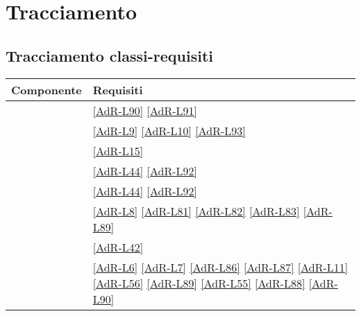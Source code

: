 \section{Tracciamento}
\subsection{Tracciamento classi-requisiti}
\begin{longtable}{|m{12cm}|>{\centering}m{2cm}|}
	\hline \textbf{Componente} & \textbf{Requisiti} \tabularnewline 
	\endfirsthead
	\hline \coderef{Framework::Model::BubbleMemory::BubbleMemory} & \ref{AdR-L90} \linebreak \ref{AdR-L91} \tabularnewline
	\hline \coderef{Framework::Model::API::LifeCycle::LifeCycle} & \ref{AdR-L9} \linebreak \ref{AdR-L10} \linebreak \ref{AdR-L93} \tabularnewline
	\hline \coderef{Framework::Model::API::Notification::WebNotification} & \ref{AdR-L15} \linebreak \tabularnewline
	\hline \coderef{Framework::Model::API::ExternalAPI::ExternalAPI} & \ref{AdR-L44} \linebreak \ref{AdR-L92} \tabularnewline
	\hline \coderef{Framework::Model::API::ExternalAPI::ExternalAPIStore} & \ref{AdR-L44} \linebreak \ref{AdR-L92} \tabularnewline
	\hline \coderef{Framework::Model::API::DBOperations::DBOperations} & \ref{AdR-L8} \linebreak \ref{AdR-L81} \linebreak \ref{AdR-L82} \linebreak \ref{AdR-L83} \linebreak \ref{AdR-L89} \tabularnewline
	\hline \coderef{Framework::Model::API::MatchRegularExpr::MatchRegularExpr} & \ref{AdR-L42} \tabularnewline
	\hline \coderef{Framework::Controller::GenericBubble} & \ref{AdR-L6} \linebreak \ref{AdR-L7} \linebreak \ref{AdR-L86} \linebreak \ref{AdR-L87} \linebreak \ref{AdR-L11} \linebreak \ref{AdR-L56} \linebreak \ref{AdR-L89} \linebreak \ref{AdR-L55} \linebreak \ref{AdR-L88} \linebreak \ref{AdR-L90} \tabularnewline

\end{longtable}
